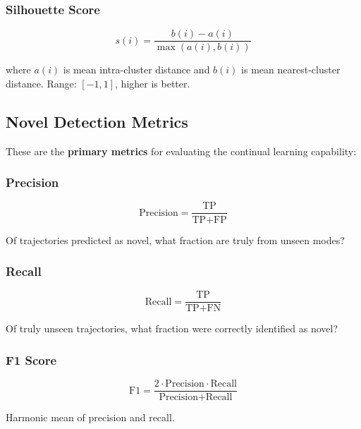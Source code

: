 \documentclass{article}
\begin{document}
\subsubsection{Silhouette Score}

\begin{equation}
    s(i) = \frac{b(i) - a(i)}{\max(a(i), b(i))}
\end{equation}

where $a(i)$ is mean intra-cluster distance and $b(i)$ is mean nearest-cluster distance. Range: $[-1, 1]$, higher is better.

\subsection{Novel Detection Metrics}

These are the \textbf{primary metrics} for evaluating the continual learning capability:

\subsubsection{Precision}

\begin{equation}
    \text{Precision} = \frac{\text{TP}}{\text{TP} + \text{FP}}
\end{equation}

Of trajectories predicted as novel, what fraction are truly from unseen modes?

\subsubsection{Recall}

\begin{equation}
    \text{Recall} = \frac{\text{TP}}{\text{TP} + \text{FN}}
\end{equation}

Of truly unseen trajectories, what fraction were correctly identified as novel?

\subsubsection{F1 Score}

\begin{equation}
    \text{F1} = \frac{2 \cdot \text{Precision} \cdot \text{Recall}}{\text{Precision} + \text{Recall}}
\end{equation}

Harmonic mean of precision and recall.
\end{document}

